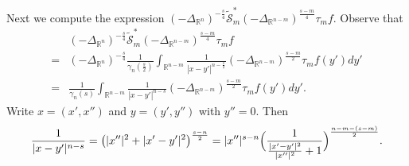 \documentclass[12pt,reqno]{amsart}%
\theoremstyle{plain}
\numberwithin{equation}{section}
\begin{document}
Next we compute the expression \( (-\Delta_{\mathbb{R}^{n}})^{-\frac{s}{4}}\widetilde{\mathcal{S}}_{m}^{\ast}(-\Delta_{\mathbb{R}^{n-m}})^{\frac{s-m}{4}} \tau_{m}f \). Observe that
\begin{align}\nonumber
&(-\Delta_{\mathbb{R}^{n}})^{-\frac{s}{4}}\widetilde{\mathcal{S}}_{m}^{\ast}(-\Delta_{\mathbb{R}^{n-m}})^{\frac{s-m}{4}} \tau_{m}f\\
\nonumber
=&(-\Delta_{\mathbb{R}^{n}})^{-\frac{s}{4}}
\frac{1}{\gamma_{n}(\frac{s}{2})}\int_{\mathbb{R}^{n-m}}\frac{1}{|x-y'|^{n-\frac{s}{2}}}
(-\Delta_{ \mathbb{R}^{n-m}})^{\frac{s-m}{2}}\tau_{m}f(y')dy'\\[2pt]
\label{5.2}
=&\frac{1}{\gamma_{n}(s)}
\int_{\mathbb{R}^{n-m}}\frac{1}{|x-y'|^{n-s}}
(-\Delta_{ \mathbb{R}^{n-m}})^{\frac{s-m}{2}}\tau_{m}f(y')dy'.
\end{align}
Write \( x=(x',x'') \) and \( y=(y',y'') \) with \( y''=0 \). Then
\begin{align}\label{b5.1}
\frac{1}{|x-y'|^{n-s}}
= \bigl(|x''|^{2}+|x'-y'|^{2}\bigr)^{\frac{s-n}{2}}
= |x''|^{s-n}
\Bigl(\frac{1}{\frac{|x'-y'|^{2}}{|x''|^{2}}+1}\Bigr)^{\frac{n-m-(s-m)}{2}}.
\end{align}
\end{document}

